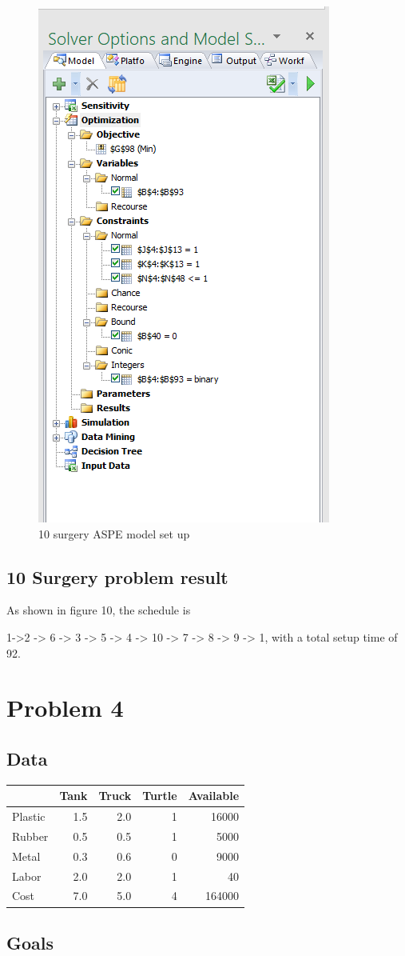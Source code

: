 \documentclass[]{article}
\begin{document}
\begin{figure}
\centering
\includegraphics[height=0.50000\textwidth]{Figures/Homework3/modelp3b.PNG}
\caption{10 surgery ASPE model set up}
\end{figure}

\subsection{10 Surgery problem result}\label{surgery-problem-result-1}

As shown in figure 10, the schedule is

1-\textgreater{}2 -\textgreater{} 6 -\textgreater{} 3 -\textgreater{} 5
-\textgreater{} 4 -\textgreater{} 10 -\textgreater{} 7 -\textgreater{} 8
-\textgreater{} 9 -\textgreater{} 1, with a total setup time of 92.

\section{Problem 4}\label{problem-4}

\subsection{Data}\label{data}

\begin{longtable}[]{@{}lrrrr@{}}
\toprule
& Tank & Truck & Turtle & Available\tabularnewline
\midrule
\endhead
Plastic & 1.5 & 2.0 & 1 & 16000\tabularnewline
Rubber & 0.5 & 0.5 & 1 & 5000\tabularnewline
Metal & 0.3 & 0.6 & 0 & 9000\tabularnewline
Labor & 2.0 & 2.0 & 1 & 40\tabularnewline
Cost & 7.0 & 5.0 & 4 & 164000\tabularnewline
\bottomrule
\end{longtable}

\subsection{Goals}\label{goals}
\end{document}
